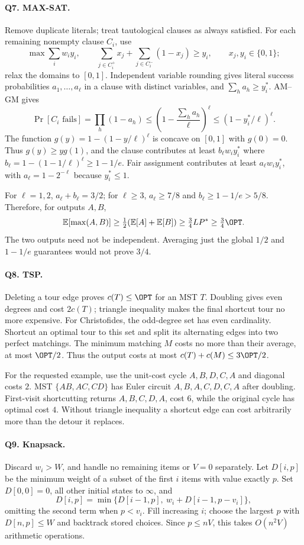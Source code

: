 \paragraph{Q7. MAX-SAT.}
Remove duplicate literals; treat tautological clauses as always satisfied.
For each remaining nonempty clause $C_i$, use
\[
\max\sum_iw_iy_i,\qquad
\sum_{j\in C_i^+}x_j+\sum_{j\in C_i^-}(1-x_j)\ge y_i,
\qquad x_j,y_i\in\{0,1\};
\]
relax the domains to $[0,1]$.  Independent variable rounding gives literal
success probabilities $a_1,\ldots,a_\ell$ in a clause with distinct
variables, and $\sum_h a_h\ge y_i^*$.  AM--GM gives
\[
\Pr[C_i\text{ fails}]=\prod_h(1-a_h)
\le\left(1-\frac{\sum_h a_h}{\ell}\right)^\ell
\le(1-y_i^*/\ell)^\ell.
\]
The function $g(y)=1-(1-y/\ell)^\ell$ is concave on $[0,1]$ with
$g(0)=0$.  Thus $g(y)\ge yg(1)$, and the clause contributes at least
$b_\ell w_i y_i^*$ where $b_\ell=1-(1-1/\ell)^\ell\ge1-1/e$.
Fair assignment contributes at least $a_\ell w_i y_i^*$, with
$a_\ell=1-2^{-\ell}$ because $y_i^*\le1$.

For $\ell=1,2$, $a_\ell+b_\ell=3/2$; for $\ell\ge3$,
$a_\ell\ge7/8$ and $b_\ell\ge1-1/e>5/8$.  Therefore, for outputs $A,B$,
\[
\mathbb E[\max(A,B)]\ge\tfrac12(\mathbb E[A]+\mathbb E[B])
\ge\tfrac34 LP^*\ge\tfrac34\OPT.
\]
The two outputs need not be independent.  Averaging just the global
$1/2$ and $1-1/e$ guarantees would not prove $3/4$.

\paragraph{Q8. TSP.}
Deleting a tour edge proves $c(T)\le\OPT$ for an MST $T$.  Doubling gives
even degrees and cost $2c(T)$; triangle inequality makes the final shortcut
tour no more expensive.  For Christofides, the odd-degree set has even
cardinality.  Shortcut an optimal tour to this set and split its alternating
edges into two perfect matchings.  The minimum matching $M$ costs no more
than their average, at most $\OPT/2$.  Thus the output costs at most
$c(T)+c(M)\le3\OPT/2$.

For the requested example, use the unit-cost cycle $A,B,D,C,A$ and diagonal
costs $2$.  MST $\{AB,AC,CD\}$ has Euler circuit $A,B,A,C,D,C,A$ after
doubling.  First-visit shortcutting returns $A,B,C,D,A$, cost $6$, while
the original cycle has optimal cost $4$.  Without triangle inequality a
shortcut edge can cost arbitrarily more than the detour it replaces.

\paragraph{Q9. Knapsack.}
Discard $w_i>W$, and handle no remaining items or $V=0$ separately.
Let $D[i,p]$ be the minimum weight of a subset of the first $i$ items with
value exactly $p$.  Set $D[0,0]=0$, all other initial states to $\infty$, and
\[
D[i,p]=\min\{D[i-1,p],\ w_i+D[i-1,p-v_i]\},
\]
omitting the second term when $p<v_i$.  Fill increasing $i$; choose the
largest $p$ with $D[n,p]\le W$ and backtrack stored choices.  Since
$p\le nV$, this takes $O(n^2V)$ arithmetic operations.

